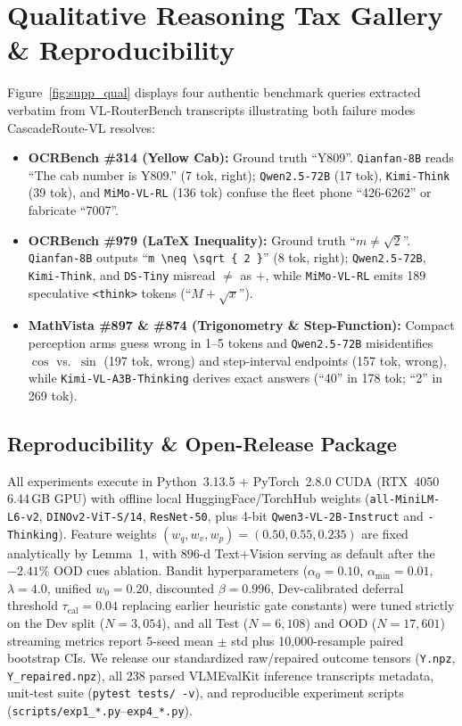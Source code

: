 \documentclass[10pt,twocolumn,letterpaper]{article}
\begin{document}
\section{Qualitative Reasoning Tax Gallery \& Reproducibility}
\label{sec:supp_qual}

Figure~\ref{fig:supp_qual} displays four authentic benchmark queries extracted verbatim from VL-RouterBench transcripts illustrating both failure modes CascadeRoute-VL resolves:
\begin{itemize}
    \item \textbf{OCRBench \#314 (Yellow Cab):} Ground truth ``Y809''. \texttt{Qianfan-8B} reads ``The cab number is Y809.'' (7 tok, right); \texttt{Qwen2.5-72B} (17 tok), \texttt{Kimi-Think} (39 tok), and \texttt{MiMo-VL-RL} (136 tok) confuse the fleet phone ``426-6262'' or fabricate ``7007''.
    \item \textbf{OCRBench \#979 (LaTeX Inequality):} Ground truth ``$m \ne \sqrt{2}$''. \texttt{Qianfan-8B} outputs ``\texttt{m \textbackslash neq \textbackslash sqrt \{ 2 \}}'' (8 tok, right); \texttt{Qwen2.5-72B}, \texttt{Kimi-Think}, and \texttt{DS-Tiny} misread $\ne$ as $+$, while \texttt{MiMo-VL-RL} emits 189 speculative \texttt{<think>} tokens (``$M+\sqrt{x}$'').
    \item \textbf{MathVista \#897 \& \#874 (Trigonometry \& Step-Function):} Compact perception arms guess wrong in 1--5 tokens and \texttt{Qwen2.5-72B} misidentifies $\cos$ vs.\ $\sin$ (197 tok, wrong) and step-interval endpoints (157 tok, wrong), while \texttt{Kimi-VL-A3B-Thinking} derives exact answers (``40'' in 178 tok; ``2'' in 269 tok).
\end{itemize}

\subsection{Reproducibility \& Open-Release Package}
All experiments execute in Python~3.13.5 + PyTorch~2.8.0 CUDA (RTX~4050 6.44\,GB GPU) with offline local HuggingFace/TorchHub weights (\texttt{all-MiniLM-L6-v2}, \texttt{DINOv2-ViT-S/14}, \texttt{ResNet-50}, plus 4-bit \texttt{Qwen3-VL-2B-Instruct} and \texttt{-Thinking}). Feature weights $(w_q, w_v, w_p){=}(0.50, 0.55, 0.235)$ are fixed analytically by Lemma~1, with $896$-d Text+Vision serving as default after the $-2.41\%$ OOD cues ablation. Bandit hyperparameters ($\alpha_0{=}0.10$, $\alpha_{\min}{=}0.01$, $\lambda{=}4.0$, unified $w_0{=}0.20$, discounted $\beta{=}0.996$, Dev-calibrated deferral threshold $\tau_{\text{cal}}{=}0.04$ replacing earlier heuristic gate constants) were tuned strictly on the Dev split ($N{=}3{,}054$), and all Test ($N{=}6{,}108$) and OOD ($N{=}17{,}601$) streaming metrics report 5-seed mean $\pm$ std plus 10,000-resample paired bootstrap CIs. We release our standardized raw/repaired outcome tensors (\texttt{Y.npz}, \texttt{Y\_repaired.npz}), all 238 parsed VLMEvalKit inference transcripts metadata, unit-test suite (\texttt{pytest tests/ -v}), and reproducible experiment scripts (\texttt{scripts/exp1\_*.py}--\texttt{exp4\_*.py}).
\end{document}
